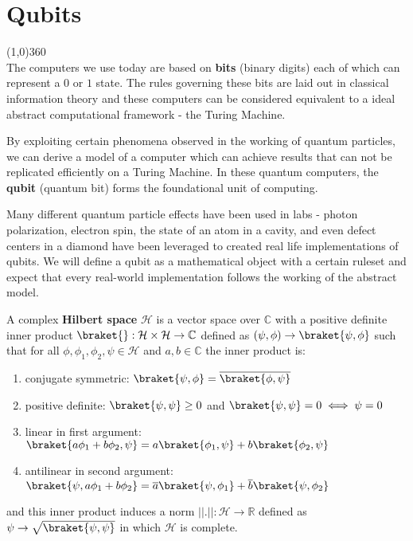 \chapter{Qubits}

\line(1,0){360} \\

The computers we use today are based on \textbf{bits} (binary digits) each of which can represent a $0$ or $1$ state. The rules governing these bits are laid out in classical information theory and these computers can be considered equivalent to a ideal abstract computational framework - the Turing Machine.

By exploiting certain phenomena observed in the working of quantum particles, we can derive a model of a computer which can achieve results that can not be replicated efficiently on a Turing Machine. In these quantum computers, the \textbf{qubit} (quantum bit) forms the foundational unit of computing.

Many different quantum particle effects have been used in labs - photon polarization, electron spin, the state of an atom in a cavity, and even defect centers in a diamond have been leveraged to created real life implementations of qubits. We will define a qubit as a mathematical object with a certain ruleset and expect that every real-world implementation follows the working of the abstract model.

\begin{samepage}
\begin{defn}
    A complex \textbf{Hilbert space} $\mathcal{H}$ is a vector space over $\mathbb{C}$ with a positive definite inner product $\braket{} : \mathcal{H} \times \mathcal{H} \to \mathbb{C}$ defined as $(\psi,\phi) \to \braket{\psi,\phi}$ such that for all $\phi, \phi_1, \phi_2, \psi \in \mathcal{H}$ and $a, b \in \mathbb{C}$ the inner product is:
    \begin{enumerate}
        \item conjugate symmetric: $\braket{\psi,\phi} = \overline{\braket{\phi,\psi}}$
        \item positive definite: $\braket{\psi, \psi} \geq 0$ and $\braket{\psi, \psi} = 0 \iff \psi = 0$
        \item linear in first argument: $\braket{a \phi_1 + b \phi_2, \psi} = a \braket{\phi_1, \psi} + b \braket{\phi_2, \psi}$
        \item antilinear in second argument: $\braket{\psi, a \phi_1 + b \phi_2} = \overline{a} \braket{\psi,\phi_1} + \overline{b} \braket{\psi,\phi_2}$
    \end{enumerate}
    and this inner product induces a norm $||.|| : \mathcal{H} \to \mathbb{R}$ defined as $\psi \to \sqrt{\braket{\psi,\psi}}$ in which $\mathcal{H}$ is complete.
\end{defn}
\end{samepage}

